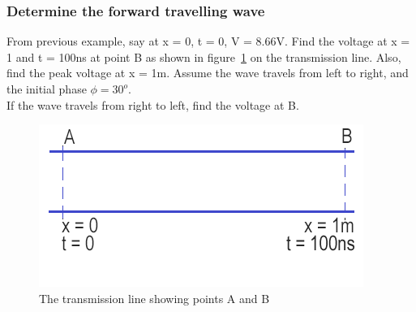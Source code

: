 \begin{exmp}
\subsubsection*{Determine the forward travelling wave}\label{exmp:forward}
From previous example, say at x = 0, t = 0, V = 8.66V. Find the voltage at x = 1 and t = 100ns at point B as shown in figure~\ref{fig:tl} on the transmission line. Also, find the peak voltage at x = 1m. Assume the wave travels from left to right, and the initial phase $\phi = 30^o$.\\
If the wave travels from right to left, find the voltage at B.
\begin{figure}[h]
\centering
\includegraphics[width=1\linewidth]{graphics/TL}
\caption{The transmission line showing points A and B}
\label{fig:tl}
\end{figure}


\end{exmp}
